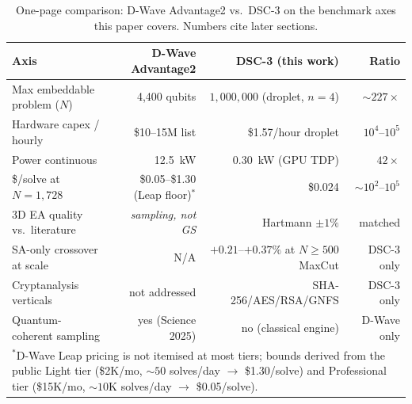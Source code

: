\documentclass[11pt,a4paper]{article}
\begin{document}
\begin{abstract}
which D-Wave has no published comparable result, and we report
negative results transparently (Knapsack QUBO trails exact DP by
$6$--$17\%$; Uncapacitated Facility Location QUBO fails feasibility
at quality budget; pure-TSP QUBO fails feasibility at $n\!\ge\!14$). We explicitly distinguish ground-state
optimisation from D-Wave's quantum-coherent sampling regime, which we
do not contest.\\[0.4em]
\textbf{Reproducibility:} All instance generators, encoders, and run
scripts are released at
\href{https://github.com/OriginNeuralAI/DSC-3}{\texttt{github.com/OriginNeuralAI/DSC-3}}
under the release tag \texttt{v0.15.1-paper}; the directory
\texttt{paper\_dsc3\_vs\_dwave/} contains every result JSON, log, and
run script for the benchmarks reported here. A permanent
Zenodo snapshot of the same tag is deposited at the DOI listed on the
title page. Every quality claim is reported with $n\!\ge\!3$ seeds
(B3) or $n\!\ge\!4$ seeds (B1, B2, B4, B5), median plus sample
standard deviation, per \S\ref{sec:methodology}. The SHA-256 digests
of every load-bearing JSON artefact are pinned in
Appendix~\ref{appx:data_manifest} for byte-for-byte verification.
\end{abstract}

\begin{table}[h]
\centering
\caption{One-page comparison: D-Wave Advantage2 vs.\ DSC-3 on the
benchmark axes this paper covers. Numbers cite later sections.}
\label{tab:comparison_oneline}
\small
\begin{tabular}{lrrr}
\toprule
Axis & D-Wave Advantage2 & DSC-3 (this work) & Ratio \\
\midrule
Max embeddable problem ($N$) & 4{,}400 qubits & $1{,}000{,}000$ (droplet, $n\!=\!4$) & $\sim 227\times$ \\
Hardware capex / hourly       & \$10--15M list   & \$1.57/hour droplet      & $10^4$--$10^5$ \\
Power continuous              & 12.5~kW          & 0.30~kW (GPU TDP)        & $42\times$ \\
\$/solve at $N\!=\!1{,}728$    & \$0.05--\$1.30 (Leap floor)$^\ast$  & \$0.024                  & $\sim$$10^2$--$10^5$ \\
3D EA quality vs.\ literature & {\it sampling, not GS} & Hartmann $\pm 1\%$   & matched \\
SA-only crossover at scale    & N/A              & $+0.21$--$+0.37\%$ at $N\!\ge\!500$ MaxCut & DSC-3 only \\
Cryptanalysis verticals       & not addressed    & SHA-256/AES/RSA/GNFS     & DSC-3 only \\
Quantum-coherent sampling     & yes (Science 2025) & no (classical engine)  & D-Wave only \\
\bottomrule
\multicolumn{4}{l}{\footnotesize $^\ast$D-Wave Leap pricing is not itemised at most tiers; bounds derived from the public Light tier (\$2K/mo, $\sim\!50$ solves/day $\to$ \$1.30/solve) and Professional tier (\$15K/mo, $\sim\!10$K solves/day $\to$ \$0.05/solve).}
\end{tabular}
\end{table}
\end{document}
